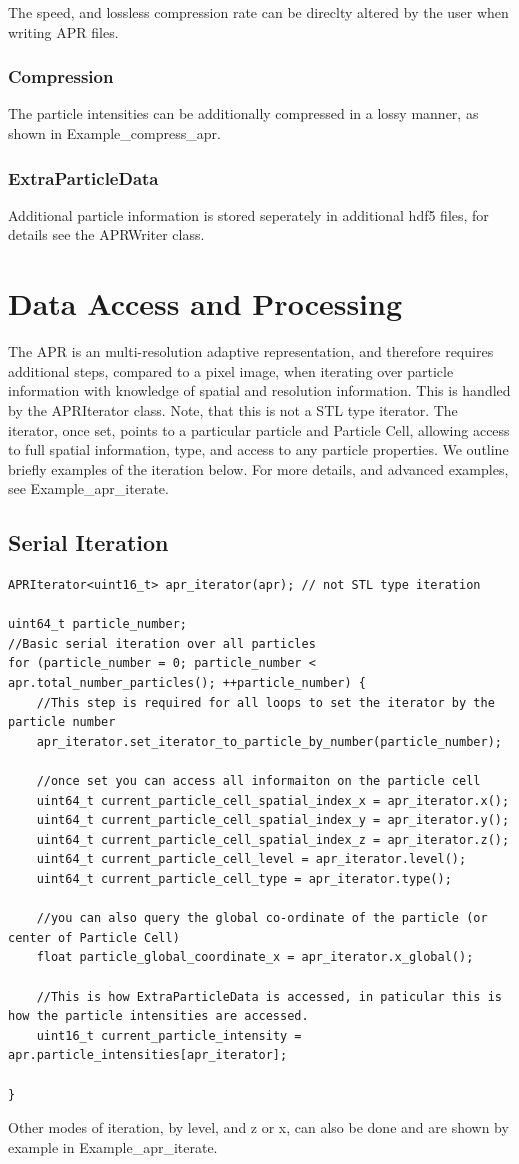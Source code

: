 \documentclass[12pt]{article}
\begin{document}
The speed, and lossless compression rate can be direclty altered by the user when writing APR files.
\subsubsection{Compression}
The particle intensities can be additionally compressed in a lossy manner, as shown in Example\_compress\_apr.
\subsubsection{ExtraParticleData}
Additional particle information is stored seperately in additional hdf5 files, for details see the APRWriter class. 
\section{Data Access and Processing}
The APR is an multi-resolution adaptive representation, and therefore requires additional steps, compared to a pixel image, when iterating over particle information with knowledge of spatial and resolution information. This is handled by the APRIterator class. Note, that this is not a STL type iterator. The iterator, once set, points to a particular particle and Particle Cell, allowing access to full spatial information, type, and access to any particle properties. We outline briefly examples of the iteration below. For more details, and advanced examples, see Example\_apr\_iterate.
\subsection{Serial Iteration}
\begin{lstlisting}
APRIterator<uint16_t> apr_iterator(apr); // not STL type iteration

uint64_t particle_number;
//Basic serial iteration over all particles
for (particle_number = 0; particle_number < apr.total_number_particles(); ++particle_number) {
	//This step is required for all loops to set the iterator by the particle number
	apr_iterator.set_iterator_to_particle_by_number(particle_number);

	//once set you can access all informaiton on the particle cell
	uint64_t current_particle_cell_spatial_index_x = apr_iterator.x();
	uint64_t current_particle_cell_spatial_index_y = apr_iterator.y();
	uint64_t current_particle_cell_spatial_index_z = apr_iterator.z();
	uint64_t current_particle_cell_level = apr_iterator.level();
	uint64_t current_particle_cell_type = apr_iterator.type();
	
	//you can also query the global co-ordinate of the particle (or center of Particle Cell)
	float particle_global_coordinate_x = apr_iterator.x_global();
	
	//This is how ExtraParticleData is accessed, in paticular this is how the particle intensities are accessed.
	uint16_t current_particle_intensity = apr.particle_intensities[apr_iterator];

}
\end{lstlisting}
Other modes of iteration, by level, and z or x, can also be done and are shown by example in Example\_apr\_iterate.
\end{document}
